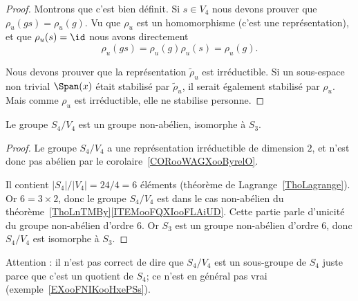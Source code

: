 \begin{proof}
    Montrons que c'est bien définit. Si \( s\in V_4\) nous devons prouver que \( \rho_u(gs)=\rho_u(g)\). Vu que \( \rho_u\) est un homomorphisme (c'est une représentation), et que \( \rho_u(s)=\id\) nous avons directement
    \begin{equation}
        \rho_u(gs)=\rho_u(g)\rho_u(s)=\rho_u(g).
    \end{equation}

    Nous devons prouver que la représentation \( \tilde \rho_u\) est irréductible. Si un sous-espace non trivial \( \Span(x)\) était stabilisé par \( \tilde \rho_u\), il serait également stabilisé par \( \rho_u\). Mais comme \( \rho_u\) est irréductible, elle ne stabilise personne.
\end{proof}

\begin{lemma}
    Le groupe \( S_4/V_4\) est un groupe non-abélien, isomorphe à \( S_3\).
\end{lemma}

\begin{proof}
    Le groupe \( S_4/V_4\) a une représentation irréductible de dimension \( 2\), et n'est donc pas abélien par le corolaire~\ref{CORooWAGXooByrelO}.

    Il contient \( | S_4 |/| V_4 |=24/4=6\) éléments (théorème de Lagrange~\ref{ThoLagrange}). Or \( 6=3\times 2\), donc le groupe \( S_4/V_4\) est dans le cas non-abélien du théorème~\ref{ThoLnTMBy}\ref{ITEMooFQXIooFLAiUD}. Cette partie parle d'unicité du groupe non-abélien d'ordre \( 6\). Or \( S_3\) est un groupe non-abélien d'ordre \( 6\), donc \( S_4/V_4\) est isomorphe à \( S_3\).
\end{proof}

Attention : il n'est pas correct de dire que \( S_4/V_4\) est un sous-groupe de \( S_4\) juste parce que c'est un quotient de \( S_4\); ce n'est en général pas vrai (exemple~\ref{EXooFNIKooHxePSs}).

